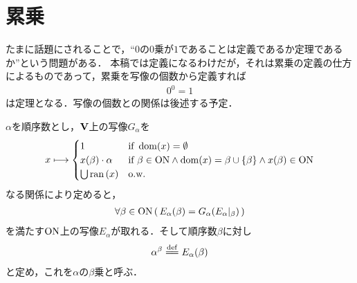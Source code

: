 \section{累乗}
	たまに話題にされることで，``$0$の$0$乗が$1$であることは定義であるか定理であるか''という問題がある．
	本稿では定義になるわけだが，それは累乗の定義の仕方によるものであって，累乗を写像の個数から定義すれば
	\begin{align}
		0^0 = 1
	\end{align}
	は定理となる．写像の個数との関係は後述する予定．
	
	\begin{screen}
		\begin{dfn}[順序数の累乗]
			$\alpha$を順序数とし，$\mathbf{V}$上の写像$G_\alpha$を
			\begin{align}
				x \longmapsto 
				\begin{cases}
					1 & \mbox{if } \operatorname{dom}(x) = \emptyset \\
					x(\beta) \cdot \alpha & \mbox{if } \beta \in \mathrm{ON} \wedge \operatorname{dom}(x) = \beta \cup \{\beta\} 
					\wedge x(\beta) \in \mathrm{ON} \\
					\bigcup \operatorname*{ran} \left(x\right) & \mbox{o.w.}
				\end{cases}
			\end{align}
			なる関係により定めると，
			\begin{align}
				\forall \beta \in \mathrm{ON}\, (\, E_\alpha(\beta) = G_\alpha(E_\alpha|_\beta)\, )
			\end{align}
			を満たす$\mathrm{ON}$上の写像$E_\alpha$が取れる．そして順序数$\beta$に対し
			\begin{align}
				\alpha^\beta \defeq E_\alpha(\beta)
			\end{align}
			と定め，これを$\alpha$の$\beta$乗と呼ぶ．
		\end{dfn}
	\end{screen}
	